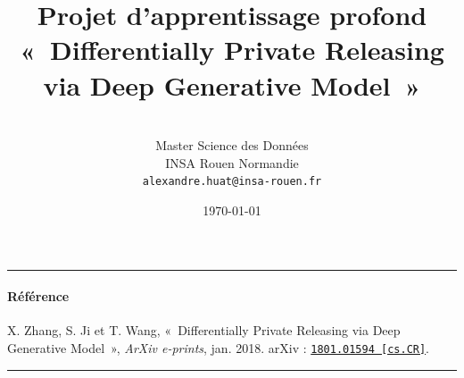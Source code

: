 \documentclass[a4paper,11pt]{article}
\title{\textbf{Projet d'apprentissage profond}\\« Differentially Private Releasing via Deep Generative Model »}
\author{\textbf{\AH}\\Master Science des Données\\INSA Rouen Normandie\\\texttt{alexandre.huat@insa-rouen.fr}}
\date{\today}
\theoremstyle{definition}
\begin{document}
\maketitle
\hrule height 1.6pt


\paragraph{Référence}
{\small X. Zhang, S. Ji et T. Wang, « Differentially Private Releasing via Deep Generative Model », \textit{ArXiv e-prints}, jan. 2018. arXiv : \href{http://arxiv.org/abs/1801.01594}{\texttt{1801.01594 [cs.CR]}}.}
\bigskip\hrule
\end{document}
